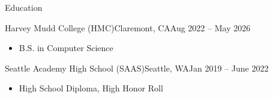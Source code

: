 \documentclass[]{mcdowellcv}
\begin{document}
\makeheader


\begin{cvsection}{Education}
	\begin{cvsubsection}{Harvey Mudd College (HMC)}{Claremont, CA}{Aug 2022 -- May 2026}
		\begin{itemize}
			\item B.S. in Computer Science%
		\end{itemize}
	\end{cvsubsection}
	\begin{cvsubsection}{Seattle Academy High School (SAAS)}{Seattle, WA}{Jan 2019 -- June 2022}
		\begin{itemize}
			\item High School Diploma, High Honor Roll%
		\end{itemize}
	\end{cvsubsection}
\end{cvsection}
\end{document}
